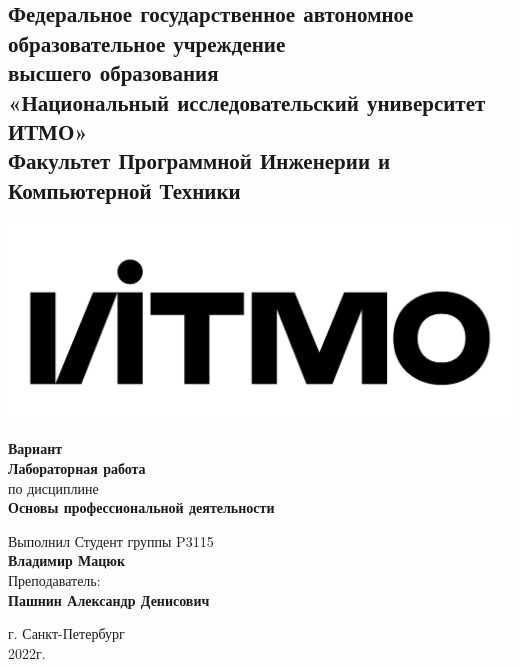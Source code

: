 \documentclass{article}
\begin{document}
\begin{center}
  \section*{
    Федеральное государственное автономное образовательное учреждение\\ высшего образования\\
    «Национальный исследовательский университет ИТМО»\\
    Факультет Программной Инженерии и Компьютерной Техники \\
   }
  \includegraphics[scale=0.2]{../../img/itmo.png}
\end{center}
\vspace{4cm}


\begin{center}
  \large \textbf{Вариант }\\
  \textbf{Лабораторная работа }\\
  по дисциплине\\
  \textbf{Основы профессиональной деятельности}
\end{center}

\vspace*{\fill}

\begin{flushright}
  Выполнил Студент группы P3115\\
  \textbf{Владимир Мацюк}\\
  Преподаватель: \\
  \textbf{Пашнин Александр Денисович}\\
\end{flushright}

\vspace{1cm}

\begin{center}
  г. Санкт-Петербург\\
  2022г.
\end{center}
\end{document}
